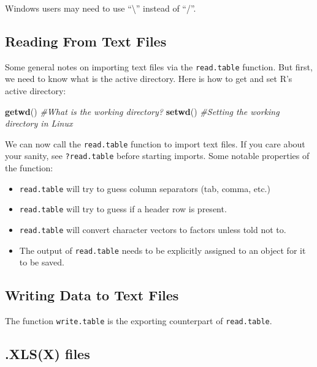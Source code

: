 \documentclass[]{book}
\newenvironment{Shaded}{\begin{snugshade}}{\end{snugshade}}
\newcommand{\KeywordTok}[1]{\textcolor[rgb]{0.13,0.29,0.53}{\textbf{{#1}}}}
\newcommand{\CommentTok}[1]{\textcolor[rgb]{0.56,0.35,0.01}{\textit{{#1}}}}
\newcommand{\NormalTok}[1]{{#1}}
\providecommand{\tightlist}{%
  \setlength{\itemsep}{0pt}\setlength{\parskip}{0pt}}
\theoremstyle{definition}
\theoremstyle{definition}
\theoremstyle{remark}
\let\BeginKnitrBlock\begin \let\EndKnitrBlock\end
\begin{document}
\BeginKnitrBlock{remark}
Windows users may need to use
``\textbackslash{}'' instead of ``/''.
\EndKnitrBlock{remark}

\subsection{Reading From Text Files}\label{reading-from-text-files}

Some general notes on importing text files via the \texttt{read.table}
function. But first, we need to know what is the active directory. Here
is how to get and set R's active directory:

\begin{Shaded}
\begin{Highlighting}[]
\KeywordTok{getwd}\NormalTok{() }\CommentTok{#What is the working directory?}
\KeywordTok{setwd}\NormalTok{() }\CommentTok{#Setting the working directory in Linux}
\end{Highlighting}
\end{Shaded}

We can now call the \texttt{read.table} function to import text files.
If you care about your sanity, see \texttt{?read.table} before starting
imports. Some notable properties of the function:

\begin{itemize}
\tightlist
\item
  \texttt{read.table} will try to guess column separators (tab, comma,
  etc.)
\item
  \texttt{read.table} will try to guess if a header row is present.
\item
  \texttt{read.table} will convert character vectors to factors unless
  told not to.
\item
  The output of \texttt{read.table} needs to be explicitly assigned to
  an object for it to be saved.
\end{itemize}

\subsection{Writing Data to Text
Files}\label{writing-data-to-text-files}

The function \texttt{write.table} is the exporting counterpart of
\texttt{read.table}.

\subsection{.XLS(X) files}\label{xlsx-files}
\end{document}
